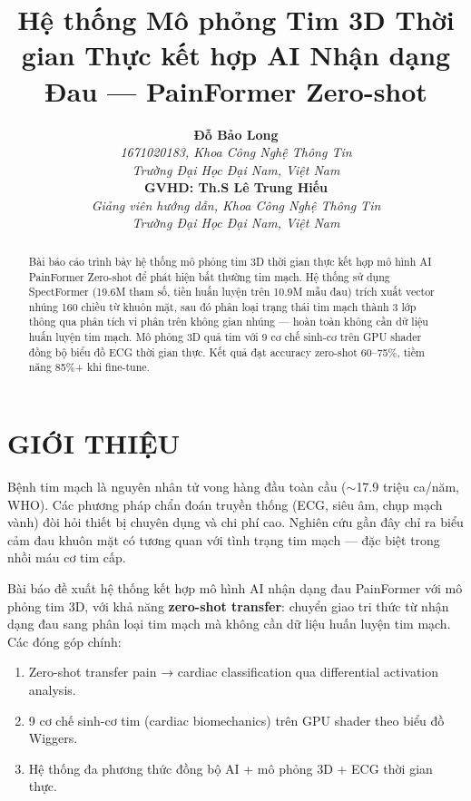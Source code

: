 \documentclass[journal]{IEEEtran}
\begin{document}
\title{Hệ thống Mô phỏng Tim 3D Thời gian Thực kết hợp AI Nhận dạng Đau — PainFormer Zero-shot}

\author{\textbf{Đỗ Bảo Long}\\
        \textit{1671020183, Khoa Công Nghệ Thông Tin} \\ 
        \textit{Trường Đại Học Đại Nam, Việt Nam} \\
        \textbf{GVHD: Th.S Lê Trung Hiếu} \\ 
        \textit{Giảng viên hướng dẫn, Khoa Công Nghệ Thông Tin} \\ 
        \textit{Trường Đại Học Đại Nam, Việt Nam}
}
     

\maketitle
\thispagestyle{plain}

\begin{abstract} 
Bài báo cáo trình bày hệ thống mô phỏng tim 3D thời gian thực kết hợp mô hình AI PainFormer Zero-shot để phát hiện bất thường tim mạch. Hệ thống sử dụng SpectFormer (19.6M tham số, tiền huấn luyện trên 10.9M mẫu đau) trích xuất vector nhúng 160 chiều từ khuôn mặt, sau đó phân loại trạng thái tim mạch thành 3 lớp thông qua phân tích vi phân trên không gian nhúng — hoàn toàn không cần dữ liệu huấn luyện tim mạch. Mô phỏng 3D quả tim với 9 cơ chế sinh-cơ trên GPU shader đồng bộ biểu đồ ECG thời gian thực. Kết quả đạt accuracy zero-shot 60--75\%, tiềm năng 85\%+ khi fine-tune.
\end{abstract}

\section{GIỚI THIỆU}

Bệnh tim mạch là nguyên nhân tử vong hàng đầu toàn cầu ($\sim$17.9 triệu ca/năm, WHO). Các phương pháp chẩn đoán truyền thống (ECG, siêu âm, chụp mạch vành) đòi hỏi thiết bị chuyên dụng và chi phí cao. Nghiên cứu gần đây chỉ ra biểu cảm đau khuôn mặt có tương quan với tình trạng tim mạch — đặc biệt trong nhồi máu cơ tim cấp.

Bài báo đề xuất hệ thống kết hợp mô hình AI nhận dạng đau PainFormer với mô phỏng tim 3D, với khả năng \textbf{zero-shot transfer}: chuyển giao tri thức từ nhận dạng đau sang phân loại tim mạch mà không cần dữ liệu huấn luyện tim mạch. Các đóng góp chính:
\begin{enumerate}
    \item Zero-shot transfer pain → cardiac classification qua differential activation analysis.
    \item 9 cơ chế sinh-cơ tim (cardiac biomechanics) trên GPU shader theo biểu đồ Wiggers.
    \item Hệ thống đa phương thức đồng bộ AI + mô phỏng 3D + ECG thời gian thực.
\end{enumerate}
\end{document}
